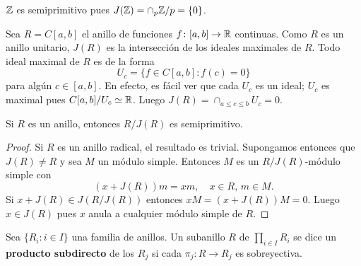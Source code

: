 \begin{example}
	$\mathbb{Z}$ es semiprimitivo pues $J(\mathbb{Z})=\cap_{p}\mathbb{Z}/p=\{0\}$.
\end{example}

\begin{example}
	Sea $R=C[a,b]$ el anillo de funciones $f\colon [a,b]\to\mathbb{R}$ continuas. Como
	$R$ es un anillo unitario, $J(R)$ es la intersección de los ideales
	maximales de $R$. Todo ideal maximal de $R$ es de la forma
	\[
		U_c=\{f\in C[a,b]:f(c)=0\}
	\]
	para algún $c\in[a,b]$. En efecto, es fácil ver que cada $U_c$ es un ideal;
	$U_c$ es maximal pues $C[a,b]/U_c\simeq\mathbb{R}$.  Luego $J(R)=\cap_{a\leq c\leq
	b}U_c=0$.
\end{example}

\begin{theorem}
	\label{thm:semiprimitivo}
	Si $R$ es un anillo, entonces $R/J(R)$ es semiprimitivo. 
\end{theorem}

\begin{proof}
	Si $R$ es un anillo radical, el resultado es trivial. Supongamos entonces
	que $J(R)\ne R$ y sea $M$ un módulo simple. Entonces $M$ es un
	$R/J(R)$-módulo simple con
	\[
		(x+J(R))m=xm,\quad
		x\in R,\,m\in M.
	\]
	Si $x+J(R)\in J(R/J(R))$ entonces $xM=(x+J(R))M=0$. Luego $x\in J(R)$ pues
	$x$ anula a cualquier módulo simple de $R$.
\end{proof}

%
%


\begin{definition}
	Sea $\{R_i:i\in I\}$ una familia de anillos. Un subanillo $R$ de
	$\prod_{i\in I}R_i$ se dice un \textbf{producto subdirecto} de los $R_j$ si
	cada $\pi_j\colon R\to R_j$ es sobreyectiva. 
\end{definition}

